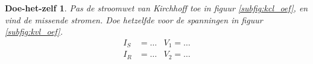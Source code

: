 \documentclass{article}
\newtheorem{DIY}{Doe-het-zelf}
\begin{document}




			\begin{DIY} Pas de stroomwet van Kirchhoff toe in figuur \ref{subfig:kcl_oef}, en vind de missende stromen. Doe hetzelfde voor de spanningen in figuur \ref{subfig:kvl_oef}.
			\begin{align*}
			    I_S &= \ldots & V_1 = \ldots\\
			    I_R &= \ldots & V_2 = \ldots
			\end{align*}
			\end{DIY}
\end{document}
